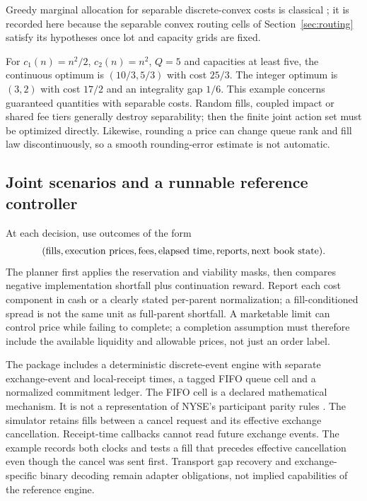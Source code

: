 Greedy marginal allocation for separable discrete-convex costs is classical
\citep{Gross1956,IbarakiKatoh1988}; it is recorded here because the separable convex routing cells of Section~\ref{sec:routing} satisfy
its hypotheses once lot and capacity grids are fixed.

For $c_1(n)=n^2/2$, $c_2(n)=n^2$, $Q=5$ and capacities at least five,
the continuous optimum is $(10/3,5/3)$ with cost $25/3$. The integer
optimum is $(3,2)$ with cost $17/2$ and an integrality gap $1/6$.
This example concerns guaranteed quantities with separable costs. Random
fills, coupled impact or shared fee tiers generally destroy separability;
then the finite joint action set must be optimized directly. Likewise,
rounding a price can change queue rank and fill law discontinuously, so a
smooth rounding-error estimate is not automatic.

\subsection{Joint scenarios and a runnable reference controller}

At each decision, use outcomes of the form
\[
 (\hbox{fills},\hbox{execution prices},\hbox{fees},
   \hbox{elapsed time},\hbox{reports},\hbox{next book state}).
\]
The planner first applies the reservation and viability masks, then compares
negative implementation shortfall plus continuation reward. Report each
cost component in cash or a clearly stated per-parent normalization;
a fill-conditioned spread is not the same unit as full-parent shortfall.
A marketable limit can control price while failing to complete; a completion
assumption must therefore include the available liquidity and allowable
prices, not just an order label.

The package includes a deterministic discrete-event engine with separate
exchange-event and local-receipt times, a tagged FIFO queue cell and a
normalized commitment ledger. The FIFO cell is a declared mathematical
mechanism. It is not a representation of NYSE's participant parity rules
\citep{nysefaq}. The simulator retains fills between a cancel request
and its effective exchange cancellation. Receipt-time callbacks cannot
read future exchange events. The example records both clocks and tests a
fill that precedes effective cancellation even though the cancel was sent
first. Transport gap recovery and exchange-specific binary decoding remain
adapter obligations, not implied capabilities of the reference engine.

